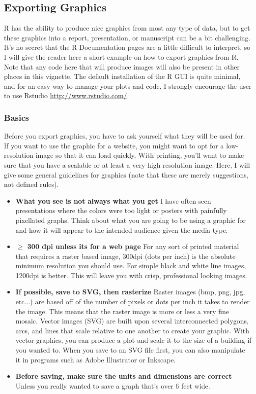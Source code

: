 \documentclass[letterpaper]{article}\usepackage[]{graphicx}\usepackage[]{color}
\newcommand{\tab}{\hspace*{1em}}
\begin{document}
\subsection{Exporting Graphics}\label{appendix:graphics}
\tab\tab R has the ability to produce nice graphics from most any type of data, but to get these graphics into a report, presentation, or manuscript can be a bit challenging. It's no secret that the R Documentation pages are a little difficult to interpret, so I will give the reader here a short example on how to export graphics from R. Note that any code here that will produce images will also be present in other places in this vignette. The default installation of the R GUI is quite minimal, and for an easy way to manage your plots and code, I strongly encourage the user to use Rstudio \url{http://www.rstudio.com/}.

\subsubsection{Basics}\label{appendix:graphics:basics}
\tab\tab Before you export graphics, you have to ask yourself what they will be used for. If you want to use the graphic for a website, you might want to opt for a low-resolution image so that it can load quickly. With printing, you'll want to make sure that you have a scalable or at least a very high resolution image. Here, I will give some general guidelines for graphics (note that these are merely suggestions, not defined rules).
\begin{itemize}
  \item \textbf{What you see is not always what you get} I have often seen presentations where the colors were too light or posters with painfully pixellated graphs. Think about what you are going to be using a graphic for and how it will appear to the intended audience given the media type.
  \item \textbf{$\geq$ 300 dpi unless its for a web page} For any sort of printed material that requires a raster based image, 300dpi (dots per inch) is the absolute minimum resolution you should use. For simple black and white line images, 1200dpi is better. This will leave you with crisp, professional looking images.
  \item \textbf{If possible, save to SVG, then rasterize} Raster images (bmp, png, jpg, etc...) are based off of the number of pixels or dots per inch it takes to render the image. This means that the raster image is more or less a very fine mosaic. Vector images (SVG) are built upon several interconnected polygons, arcs, and lines that scale relative to one another to create your graphic. With vector graphics, you can produce a plot and scale it to the size of a building if you wanted to. When you save to an SVG file first, you can also manipulate it in programs such as Adobe Illustrator or Inkscape. 
  \item \textbf{Before saving, make sure the units and dimensions are correct} Unless you really wanted to save a graph that's over 6 feet wide.
\end{itemize}
\end{document}
